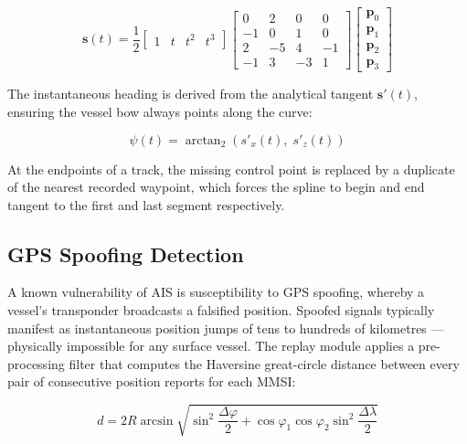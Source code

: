 \begin{equation}
    \mathbf{s}(t) = \frac{1}{2}
    \begin{bmatrix}
        1 & t & t^2 & t^3
    \end{bmatrix}
    \begin{bmatrix}
         0 &  2 &  0 &  0 \\
        -1 &  0 &  1 &  0 \\
         2 & -5 &  4 & -1 \\
        -1 &  3 & -3 &  1
    \end{bmatrix}
    \begin{bmatrix}
        \mathbf{p}_0 \\ \mathbf{p}_1 \\ \mathbf{p}_2 \\ \mathbf{p}_3
    \end{bmatrix}
\end{equation}

The instantaneous heading is derived from the analytical tangent $\mathbf{s}'(t)$, ensuring the vessel bow always points along the curve:

\begin{equation}
    \psi(t) = \arctan_2\!\left(s'_x(t),\; s'_z(t)\right)
\end{equation}

At the endpoints of a track, the missing control point is replaced by a duplicate of the nearest recorded waypoint, which forces the spline to begin and end tangent to the first and last segment respectively.

\subsection{GPS Spoofing Detection}

A known vulnerability of AIS is susceptibility to GPS spoofing, whereby a vessel's transponder broadcasts a falsified position. Spoofed signals typically manifest as instantaneous position jumps of tens to hundreds of kilometres — physically impossible for any surface vessel. The replay module applies a pre-processing filter that computes the Haversine great-circle distance between every pair of consecutive position reports for each MMSI:

\begin{equation}
    d = 2R \arcsin\!\sqrt{\sin^2\!\frac{\Delta\varphi}{2} + \cos\varphi_1\cos\varphi_2\sin^2\!\frac{\Delta\lambda}{2}}
\end{equation}

